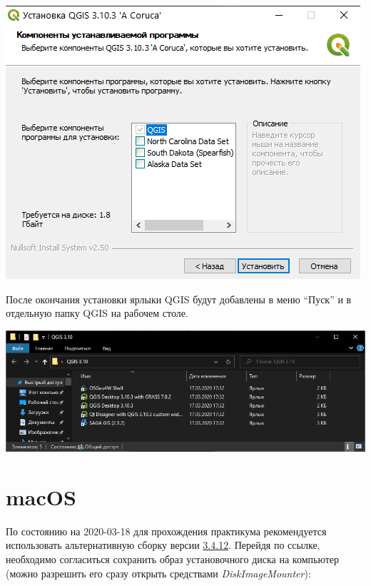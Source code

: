 \documentclass[
  12pt,
]{book}
\begin{document}
\includegraphics{images/installation_instruction_win/win04.png}

После окончания установки ярлыки QGIS будут добавлены в меню ``Пуск'' и в отдельную папку QGIS на рабочем столе.

\includegraphics{images/installation_instruction_win/win05.png}

\hypertarget{macos}{%
\section*{macOS}\label{macos}}

По состоянию на 2020-03-18 для прохождения практикума рекомендуется использовать альтернативную сборку версии \href{https://www.kyngchaos.com/files/software/qgis/QGIS-macOS-3.4.12-1.dmg}{3.4.12}. Перейдя по ссылке, необходимо согласиться сохранить образ установочного диска на компьютер (можно разрешить его сразу открыть средствами \emph{DiskImageMounter}):
\end{document}

